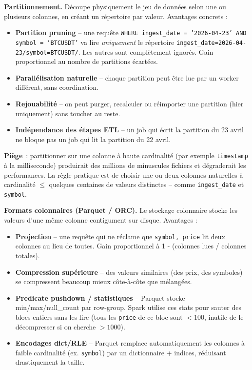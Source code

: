 \documentclass{RapportINPTCLOUD}
\begin{document}
\textbf{Partitionnement.} D\'{e}coupe physiquement le jeu de donn\'{e}es selon une ou plusieurs colonnes, en cr\'{e}ant un r\'{e}pertoire par valeur. Avantages concrets :
\begin{itemize}[leftmargin=2em]
    \item \textbf{Partition pruning} -- une requ\^{e}te \texttt{WHERE ingest\_date = '2026-04-23' AND symbol = 'BTCUSDT'} va lire \textit{uniquement} le r\'{e}pertoire \texttt{ingest\_date=2026-04-23/symbol=BTCUSDT/}. Les autres sont compl\`{e}tement ignor\'{e}s. Gain proportionnel au nombre de partitions \'{e}cart\'{e}es.
    \item \textbf{Parall\'{e}lisation naturelle} -- chaque partition peut \^{e}tre lue par un worker diff\'{e}rent, sans coordination.
    \item \textbf{Rejouabilit\'{e}} -- on peut purger, recalculer ou r\'{e}importer une partition (\og hier uniquement\fg{}) sans toucher au reste.
    \item \textbf{Ind\'{e}pendance des \'{e}tapes ETL} -- un job qui \'{e}crit la partition du 23 avril ne bloque pas un job qui lit la partition du 22 avril.
\end{itemize}

\textbf{Pi\`{e}ge}~: partitionner sur une colonne \`{a} haute cardinalit\'{e} (par exemple \texttt{timestamp} \`{a} la milliseconde) produirait des millions de minuscules fichiers et d\'{e}graderait les performances. La r\`{e}gle pratique est de choisir une ou deux colonnes naturelles \`{a} cardinalit\'{e} $\leq$ quelques centaines de valeurs distinctes -- comme \texttt{ingest\_date} et \texttt{symbol}.

\textbf{Formats colonnaires (Parquet / ORC).} Le stockage colonnaire stocke les valeurs d'une m\^{e}me colonne contigument sur disque. Avantages :
\begin{itemize}[leftmargin=2em]
    \item \textbf{Projection} -- une requ\^{e}te qui ne r\'{e}clame que \texttt{symbol, price} lit deux colonnes au lieu de toutes. Gain proportionnel \`{a} 1 - (colonnes lues / colonnes totales).
    \item \textbf{Compression sup\'{e}rieure} -- des valeurs similaires (des prix, des symboles) se compressent beaucoup mieux c\^{o}te-\`{a}-c\^{o}te que m\'{e}lang\'{e}es.
    \item \textbf{Predicate pushdown / statistiques} -- Parquet stocke min/max/null\_count par row-group. Spark utilise ces stats pour sauter des blocs entiers sans les lire (\og tous les \texttt{price} de ce bloc sont $< 100$, inutile de le d\'{e}compresser si on cherche $> 1000$\fg{}).
    \item \textbf{Encodages dict/RLE} -- Parquet remplace automatiquement les colonnes \`{a} faible cardinalit\'{e} (ex. \texttt{symbol}) par un dictionnaire + indices, r\'{e}duisant drastiquement la taille.
\end{itemize}
\end{document}
